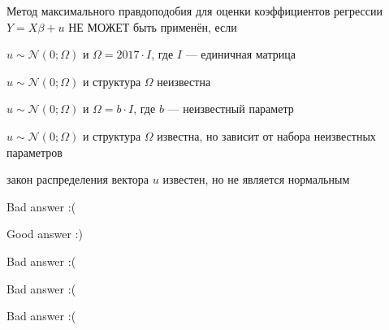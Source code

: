 
\begin{question}
Метод максимального правдоподобия для оценки коэффициентов регрессии \(Y = X\beta  + u\) НЕ МОЖЕТ быть применён, если
\begin{answerlist}
  \item \(u \sim \mathcal{N}(0; \Omega)\) и \(\Omega = 2017 \cdot I\), где \(I\) --- единичная матрица
  \item \(u \sim \mathcal{N}(0; \Omega)\) и структура \(\Omega\) неизвестна
  \item \(u \sim \mathcal{N}(0; \Omega)\) и \(\Omega =  b \cdot I\), где \(b\) --- неизвестный параметр
  \item \(u \sim \mathcal{N}(0; \Omega)\) и структура \(\Omega\) известна, но зависит от набора неизвестных параметров
  \item закон распределения вектора \(u\) известен, но не является нормальным
\end{answerlist}
\end{question}

\begin{solution}
\begin{answerlist}
  \item Bad answer :(
  \item Good answer :)
  \item Bad answer :(
  \item Bad answer :(
  \item Bad answer :(
\end{answerlist}
\end{solution}

